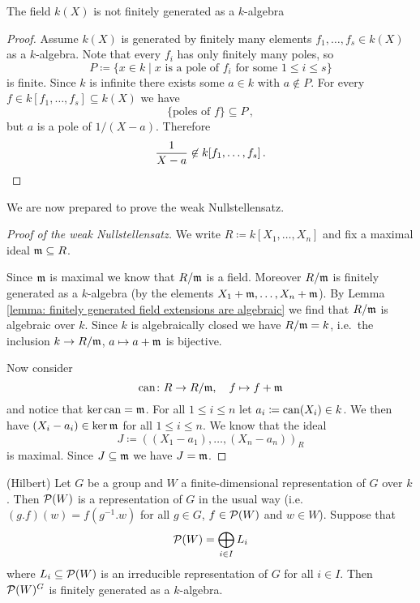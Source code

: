\begin{remark}
  The field $k(X)$ is not finitely generated as a $k$-algebra
  \begin{proof}
    Assume $k(X)$ is generated by finitely many elements $f_1, \dotsc, f_s \in k(X)$ as a $k$-algebra. Note that every $f_i$ has only finitely many poles, so
    \[
      P \coloneqq \{x \in k \mid \text{$x$ is a pole of $f_i$ for some $1 \leq i \leq s$}\}
    \]
    is finite. Since $k$ is infinite there exists some $a \in k$ with $a \not\in P$. For every $f \in k[f_1, \dotsc, f_s] \subseteq k(X)$ we have
    \[
      \{\text{poles of $f$}\} \subseteq P \,,
    \]
      but $a$ is a pole of $1/(X-a)$. Therefore
    \[
      \frac{1}{X-a} \not\in k[f_1, \dotsc, f_s] \,.
      \qedhere
    \]
  \end{proof}
\end{remark}


We are now prepared to prove the weak Nullstellensatz.


\begin{proof}[Proof of the weak Nullstellensatz]
  We write $R \coloneqq k[X_1, \dotsc, X_n]$ and fix a maximal ideal $\mathfrak{m} \subseteq R$.
  
  Since $\mathfrak{m}$ is maximal we know that $R / \mathfrak{m}$ is a field.
  Moreover $R / \mathfrak{m}$ is finitely generated as a $k$-algebra (by the elements $X_1 + \mathfrak{m}, \dotsc, X_n + \mathfrak{m}$).
  By Lemma \ref{lemma: finitely generated field extensions are algebraic} we find that $R/\mathfrak{m}$ is algebraic over $k$.
  Since $k$ is algebraically closed we have $R / \mathfrak{m} = k$, i.e.\ the inclusion $k \to R / \mathfrak{m}$, $a \mapsto a + \mathfrak{m}$ is bijective.
  
  Now consider
  \[
            \operatorname{can}
    \colon  R \to R / \mathfrak{m},
    \quad   f
    \mapsto f + \mathfrak{m}
  \]
  and notice that $\ker \operatorname{can} = \mathfrak{m}$.
  For all $1 \leq i \leq n$ let $a_i \coloneqq \operatorname{can}(X_i) \in k$.
  We then have $(X_i - a_i) \in \ker \mathfrak{m}$ for all $1 \leq i \leq n$.
  We know that the ideal
  \[
              J
    \coloneqq ( (X_1 - a_1), \dotsc, (X_n - a_n) )_R
  \]
  is maximal.
  Since $J \subseteq \mathfrak{m}$ we have $J = \mathfrak{m}$.
\end{proof}


\begin{theorem}(Hilbert)
  Let $G$ be a group and $W$ a finite-dimensional representation of $G$ over $k$.
  Then $\mathcal{P}(W)$ is a representation of $G$ in the usual way (i.e.\ $(g.f)(w) = f\left( g^{-1}.w \right)$ for all $g \in G$, $f \in \mathcal{P}(W)$ and $w \in W$).
  Suppose that
  \[
      \mathcal{P}(W)
    = \bigoplus_{i \in I} L_i
  \]
  where $L_i \subseteq \mathcal{P}(W)$ is an irreducible representation of $G$ for all $i \in I$.
  Then $\mathcal{P}(W)^G$ is finitely generated as a $k$-algebra.
\end{theorem}


